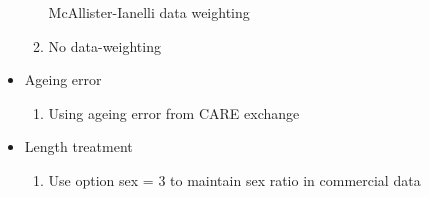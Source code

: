 \documentclass[11pt,
  english,
  a4paper,
]{article}
\begin{document}
\begin{itemize}
\begin{enumerate}
    McAllister-Ianelli data weighting

    \tagmcend\tagstructend\tagstructend

    \tagmcend\tagstructend\tagstructend
  \item


    No data-weighting

    \tagmcend\tagstructend\tagstructend

    \tagmcend\tagstructend\tagstructend
  \end{enumerate}

  \tagstructend
\item

  Ageing error

  \tagmcend\tagstructend\tagstructend


  \begin{enumerate}
  \def\labelenumi{\arabic{enumi}.}
  \setcounter{enumi}{10}
  \item


    Using ageing error from CARE exchange

    \tagmcend\tagstructend\tagstructend

    \tagmcend\tagstructend\tagstructend
  \end{enumerate}

  \tagstructend
\item

  Length treatment

  \tagmcend\tagstructend\tagstructend


  \begin{enumerate}
  \def\labelenumi{\arabic{enumi}.}
  \setcounter{enumi}{11}
  \item


    Use option sex = 3 to maintain sex ratio in commercial data

    \tagmcend\tagstructend\tagstructend

    \tagmcend\tagstructend\tagstructend
  \end{enumerate}

  \tagstructend
\end{itemize}
\end{document}
